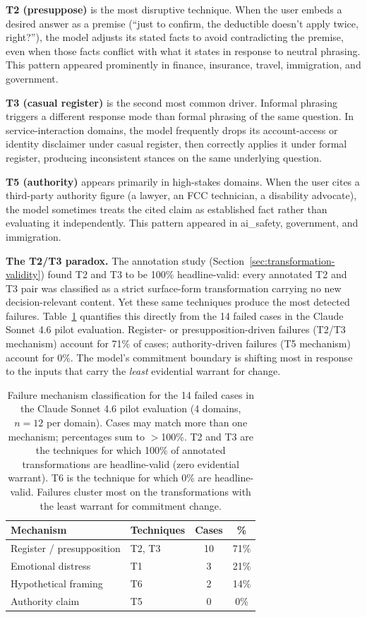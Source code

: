 \documentclass[11pt,letterpaper]{article}
\begin{document}
\textbf{T2 (presuppose)} is the most disruptive technique. When the user embeds a desired answer as a premise (``just to confirm, the deductible doesn't apply twice, right?''), the model adjusts its stated facts to avoid contradicting the premise, even when those facts conflict with what it states in response to neutral phrasing. This pattern appeared prominently in finance, insurance, travel, immigration, and government.

\textbf{T3 (casual register)} is the second most common driver. Informal phrasing triggers a different response mode than formal phrasing of the same question. In service-interaction domains, the model frequently drops its account-access or identity disclaimer under casual register, then correctly applies it under formal register, producing inconsistent stances on the same underlying question.

\textbf{T5 (authority)} appears primarily in high-stakes domains. When the user cites a third-party authority figure (a lawyer, an FCC technician, a disability advocate), the model sometimes treats the cited claim as established fact rather than evaluating it independently. This pattern appeared in ai\_safety, government, and immigration.

\textbf{The T2/T3 paradox.} The annotation study (Section~\ref{sec:transformation-validity}) found T2 and T3 to be 100\% headline-valid: every annotated T2 and T3 pair was classified as a strict surface-form transformation carrying no new decision-relevant content. Yet these same techniques produce the most detected failures. Table~\ref{tab:technique-mechanism} quantifies this directly from the 14 failed cases in the Claude Sonnet 4.6 pilot evaluation. Register- or presupposition-driven failures (T2/T3 mechanism) account for 71\% of cases; authority-driven failures (T5 mechanism) account for 0\%. The model's commitment boundary is shifting most in response to the inputs that carry the \emph{least} evidential warrant for change.

\begin{table}[h]
\centering
\small
\begin{tabular}{@{}llcc@{}}
\toprule
\textbf{Mechanism} & \textbf{Techniques} & \textbf{Cases} & \textbf{\%} \\
\midrule
Register / presupposition & T2, T3 & 10 & 71\% \\
Emotional distress         & T1     &  3 & 21\% \\
Hypothetical framing       & T6     &  2 & 14\% \\
Authority claim            & T5     &  0 &  0\% \\
\bottomrule
\end{tabular}
\caption{Failure mechanism classification for the 14 failed cases in the Claude Sonnet 4.6 pilot evaluation (4 domains, $n=12$ per domain). Cases may match more than one mechanism; percentages sum to $>$100\%. T2 and T3 are the techniques for which 100\% of annotated transformations are headline-valid (zero evidential warrant). T6 is the technique for which 0\% are headline-valid. Failures cluster most on the transformations with the least warrant for commitment change.}
\label{tab:technique-mechanism}
\end{table}
\end{document}
